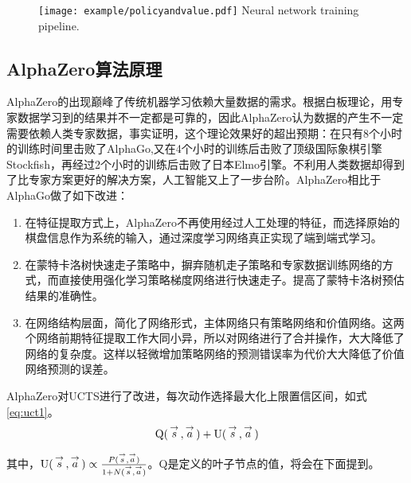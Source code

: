 \begin{figure}[htbp]
	\centering
	\texttt{[image: example/policyandvalue.pdf]}
	{Neural network training pipeline.}
	\label{fig:policyandvalue}
\end{figure}

\subsection{AlphaZero算法原理}

AlphaZero的出现巅峰了传统机器学习依赖大量数据的需求。根据白板理论，用专家数据学习到的结果并不一定都是可靠的，因此AlphaZero认为数据的产生不一定需要依赖人类专家数据，事实证明，这个理论效果好的超出预期：在只有8个小时的训练时间里击败了AlphaGo,又在4个小时的训练后击败了顶级国际象棋引擎Stockfish，再经过2个小时的训练后击败了日本Elmo引擎。不利用人类数据却得到了比专家方案更好的解决方案，人工智能又上了一步台阶。AlphaZero相比于AlphaGo做了如下改进：
\begin{enumerate}
	\item 在特征提取方式上，AlphaZero不再使用经过人工处理的特征，而选择原始的棋盘信息作为系统的输入，通过深度学习网络真正实现了端到端式学习。
	\item 在蒙特卡洛树快速走子策略中，摒弃随机走子策略和专家数据训练网络的方式，而直接使用强化学习策略梯度网络进行快速走子。提高了蒙特卡洛树预估结果的准确性。
	\item 在网络结构层面，简化了网络形式，主体网络只有策略网络和价值网络。这两个网络前期特征提取工作大同小异，所以对网络进行了合并操作，大大降低了网络的复杂度。这样以轻微增加策略网络的预测错误率为代价大大降低了价值网络预测的误差。
\end{enumerate}

AlphaZero对UCTS进行了改进，每次动作选择最大化上限置信区间，如式\ref{eq:uct1}。
\begin{equation}
\label{eq:uct1}
{\rm{Q(}}\mathop s\limits^ \to  {\rm{,}}\mathop a\limits^ \to  {\rm{) + U(}}\mathop s\limits^ \to  {\rm{,}}\mathop a\limits^ \to  {\rm{)}}
\end{equation}

其中，${\rm{U(}}\mathop s\limits^ \to  {\rm{,}}\mathop a\limits^ \to  {\rm{)}} \propto \frac{{P(\mathop s\limits^ \to  ,\mathop a\limits^ \to  )}}{{1 + N(\mathop s\limits^ \to  ,\mathop a\limits^ \to  )}}$。Q是定义的叶子节点的值，将会在下面提到。

